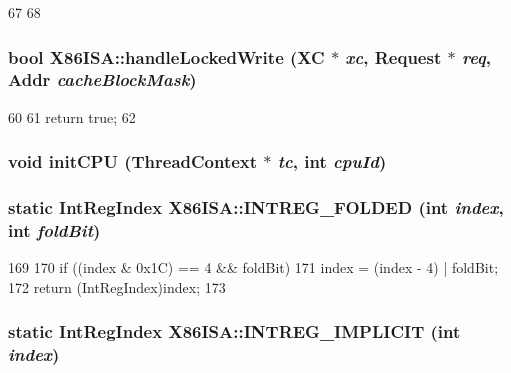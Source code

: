 \begin{DoxyCode}
67     {
68     }
\end{DoxyCode}
\hypertarget{namespaceX86ISA_a3a214e9047351ab4edcf64937e08de6d}{
\subsubsection[{handleLockedWrite}]{\setlength{\rightskip}{0pt plus 5cm}bool X86ISA::handleLockedWrite (XC $\ast$ {\em xc}, \/  {\bf Request} $\ast$ {\em req}, \/  {\bf Addr} {\em cacheBlockMask})}}
\label{namespaceX86ISA_a3a214e9047351ab4edcf64937e08de6d}



\begin{DoxyCode}
60     {
61         return true;
62     }
\end{DoxyCode}
\hypertarget{namespaceX86ISA_aded557a1e716c6f849b0e0b05fc77676}{
\subsubsection[{initCPU}]{\setlength{\rightskip}{0pt plus 5cm}void initCPU ({\bf ThreadContext} $\ast$ {\em tc}, \/  int {\em cpuId})}}
\label{namespaceX86ISA_aded557a1e716c6f849b0e0b05fc77676}
\hypertarget{namespaceX86ISA_a747f6995af14f9cf225a0a9385d157f4}{
\subsubsection[{INTREG\_\-FOLDED}]{\setlength{\rightskip}{0pt plus 5cm}static IntRegIndex X86ISA::INTREG\_\-FOLDED (int {\em index}, \/  int {\em foldBit})}}
\label{namespaceX86ISA_a747f6995af14f9cf225a0a9385d157f4}



\begin{DoxyCode}
169     {
170         if ((index & 0x1C) == 4 && foldBit)
171             index = (index - 4) | foldBit;
172         return (IntRegIndex)index;
173     }
\end{DoxyCode}
\hypertarget{namespaceX86ISA_a6920fb8f756a52ab3ff6b34df60f836c}{
\subsubsection[{INTREG\_\-IMPLICIT}]{\setlength{\rightskip}{0pt plus 5cm}static IntRegIndex X86ISA::INTREG\_\-IMPLICIT (int {\em index})}}
\label{namespaceX86ISA_a6920fb8f756a52ab3ff6b34df60f836c}




